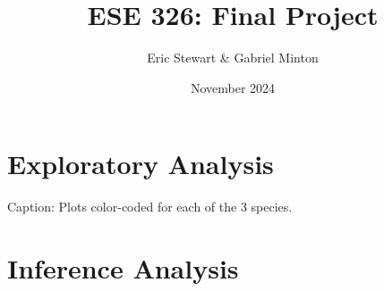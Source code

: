 \documentclass{article}
\title{ESE 326: Final Project}
\author{Eric Stewart \& Gabriel Minton}
\date{November 2024}
\begin{document}
\maketitle

\section{Exploratory Analysis}

\color{Aquamarine}
Caption: Plots color-coded for each of the 3 species.

\section{Inference Analysis}
\end{document}
